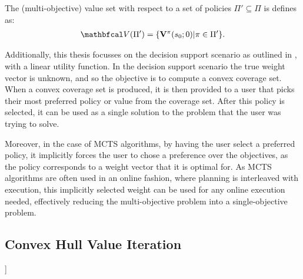 
    \begin{defn}
        \label{def:mo_value_set}
        The \textnormal{(multi-objective) value set} with respect to a set of policies $\Pi'\subseteq\Pi$ is defines as:
        \begin{align}
            \bfcl{V}(\Pi') = \{\bff{V}^{\pi}(s_0;0) | \pi \in \Pi'\}.
        \end{align}
    \end{defn}


    Additionally, this thesis focusses on the decision support scenario as outlined in , with a linear utility function. In the decision support scenario the true weight vector is unknown, and so the objective is to compute a convex coverage set. When a convex coverage set is produced, it is then provided to a user that picks their most preferred policy or value from the coverage set. After this policy is selected, it can be used as a single solution to the problem that the user was trying to solve. 

    Moreover, in the case of MCTS algorithms, by having the user select a preferred policy, it implicitly forces the user to chose a preference over the objectives, as the policy corresponds to a weight vector that it is optimal for. As MCTS algorithms are often used in an online fashion, where planning is interleaved with execution, this implicitly selected weight can be used for any online execution needed, effectively reducing the multi-objective problem into a single-objective problem. 





    \subsection{Convex Hull Value Iteration}
        ]

